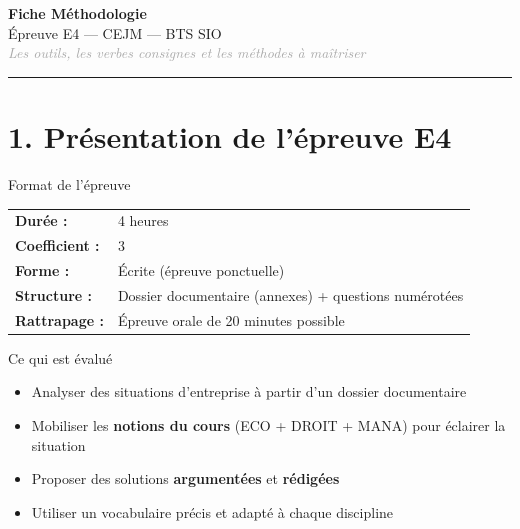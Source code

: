 \documentclass[11pt,a4paper]{article}
\begin{document}
\begin{center}
  {\Large\bfseries\textcolor{mainColor}{Fiche Méthodologie}}\\[2pt]
  {\large Épreuve E4 — CEJM — BTS SIO}\\[4pt]
  \textit{\textcolor{darkGray}{Les outils, les verbes consignes et les méthodes à maîtriser}}
\end{center}
\vspace{4pt}\hrule\vspace{8pt}

\section*{\textcolor{mainColor}{1. Présentation de l'épreuve E4}}

\begin{methbox}{Format de l'épreuve}
\begin{tabular}{ll}
\textbf{Durée :} & 4 heures \\
\textbf{Coefficient :} & 3 \\
\textbf{Forme :} & Écrite (épreuve ponctuelle) \\
\textbf{Structure :} & Dossier documentaire (annexes) + questions numérotées \\
\textbf{Rattrapage :} & Épreuve orale de 20 minutes possible \\
\end{tabular}
\end{methbox}

\vspace{4pt}
\begin{methbox}{Ce qui est évalué}
\begin{itemize}
  \item Analyser des situations d'entreprise à partir d'un dossier documentaire
  \item Mobiliser les \textbf{notions du cours} (ECO + DROIT + MANA) pour éclairer la situation
  \item Proposer des solutions \textbf{argumentées} et \textbf{rédigées}
  \item Utiliser un vocabulaire précis et adapté à chaque discipline
\end{itemize}
\end{methbox}
\end{document}
